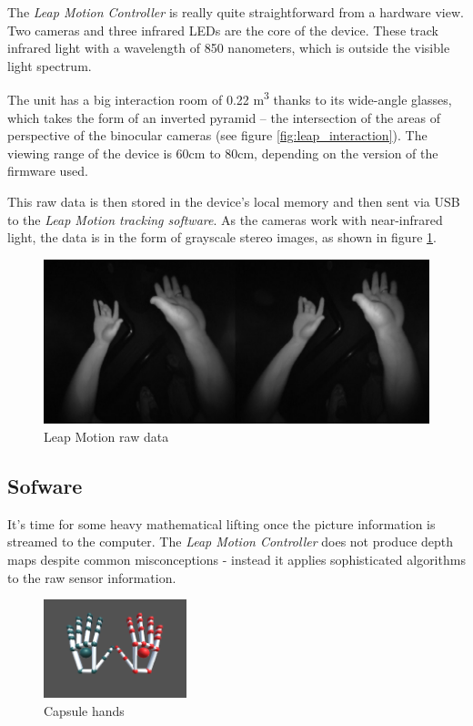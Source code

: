 \documentclass[12pt,a4paper,twoside]{report}
\begin{document}
The \textit{Leap Motion Controller} is really quite straightforward from a hardware view. Two cameras and three infrared LEDs are the core of the device. These track infrared light with a wavelength of 850 nanometers, which is outside the visible light spectrum. \cite{LeapArticle}

The unit has a big interaction room of 0.22 m\textsuperscript{3} thanks to its wide-angle glasses, which takes the form of an inverted pyramid – the intersection of the areas of perspective of the binocular cameras (see figure \ref{fig:leap_interaction}). The viewing range of the device is 60cm to 80cm, depending on the version of the firmware used.

This raw data is then stored in the device's local memory and then sent via USB to the \textit{Leap Motion tracking software}. As the cameras work with near-infrared light, the data is in the form of grayscale stereo images, as shown in figure \ref{fig:leap_raw}.

\begin{figure}[h]
  \centering
  \includegraphics[width=0.9\linewidth]{img/Leap_raw.jpg}
  \caption{Leap Motion raw data}
  \label{fig:leap_raw}
\end{figure}

\subsection{Sofware}

It's time for some heavy mathematical lifting once the picture information is streamed to the computer. The \textit{Leap Motion Controller} does not produce depth maps despite common misconceptions - instead it applies sophisticated algorithms to the raw sensor information.

\begin{figure}
  \includegraphics[width=0.37\textwidth]{img/Leap_capsule_hands.png}
  \caption{Capsule hands}
  \label{fig:leap_capsule}
\end{figure}
\end{document}
